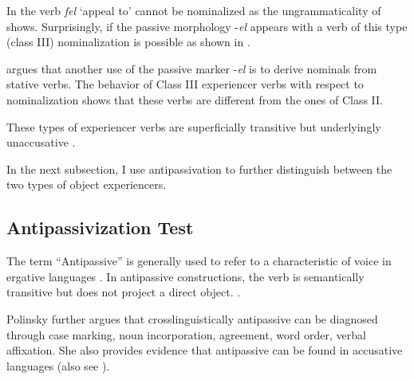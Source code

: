 \documentclass[output=paper]{langscibook}
\begin{document}
In  the verb \textit{fel} ‘appeal to’ cannot be nominalized as the ungrammaticality of   shows. Surprisingly, if the passive morphology -\textit{el} appears with a verb of this type (class III) nominalization is possible as shown in .

\ea \label{ex:tamba:18}
\z
\z

\citet{Faye2013} argues that another use of the passive marker -\textit{el}  is to derive nominals from stative verbs. The behavior of Class III experiencer verbs with respect to nominalization  shows that these verbs are different from the ones of Class II. 

These types of experiencer verbs are superficially transitive but underlyingly unaccusative \cite{Belletti1988, Pesetsky1995, Landau2010} .  

In the next subsection, I use antipassivation to further distinguish between the two types of object experiencers.

\subsection{Antipassivization Test}

The term “Antipassive” is generally used to refer to a characteristic of voice in ergative languages \citep{Crystal2008}. In antipassive constructions, the verb is semantically transitive but does not project a direct object. \citep{Polinsky2017}. 

Polinsky further argues that crosslinguistically antipassive can be diagnosed through case marking, noun incorporation, agreement, word order, verbal affixation. She also provides evidence that antipassive can be found in accusative languages (also see \citealt{Heaton2017}). 
\end{document}
